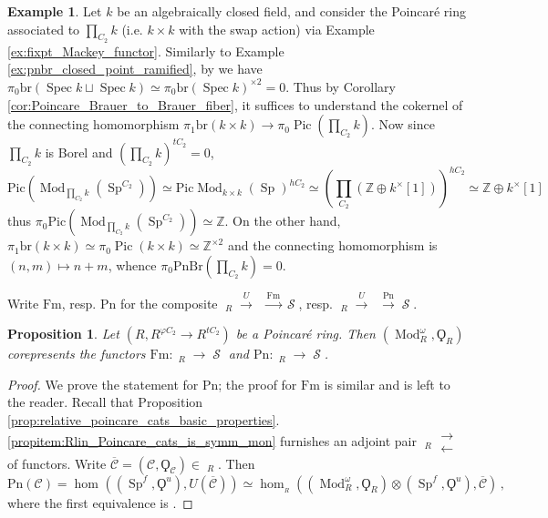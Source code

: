 \documentclass{article}
\DeclareMathOperator{\Spec}{Spec}
\DeclareMathOperator{\Cath}{Cat^h_\infty} %
\DeclareMathOperator{\Catp}{Cat^p_\infty} %
\DeclareMathOperator{\Catpidem}{Cat^p_{\infty, idem}} %
\DeclareMathOperator{\Mod}{Mod} %
\DeclareMathOperator{\Pic}{Pic} %
\DeclareMathOperator{\Spectra}{Sp} %
\DeclareMathOperator{\Spaces}{\mathcal{S}} %
\newcommand{\ZZ}{\mathbb{Z}}
\newcommand{\pnbr}{\ensuremath{\mathrm{PnBr}}}
\newcommand{\pic}{\ensuremath{\mathrm{Pic}}}
\newcommand{\rlarrows}{\mathrel{\substack{\textstyle\longrightarrow\\[-0.6ex]
                                            \textstyle\longleftarrow}}}
\newtheorem{proposition}[equation]{Proposition}
\theoremstyle{definition}
\newtheorem{example}[equation]{Example}
\begin{document}
\begin{example}\label{ex:pnbr_closed_pt_unramified}
    Let $ k $ be an algebraically closed field, and consider the Poincar\'e ring associated to $ \prod_{C_2} k $ (i.e. $ k \times k $ with the swap action) via Example \ref{ex:fixpt_Mackey_functor}. 
    Similarly to Example \ref{ex:pnbr_closed_point_ramified}, by \cite[Proposition 1.9]{MR2957304} we have $ \pi_0 \mathrm{br}(\Spec k \sqcup \Spec k) \simeq \pi_0 \mathrm{br}(\Spec k)^{\times 2} = 0 $. 
    Thus by Corollary \ref{cor:Poincare_Brauer_to_Brauer_fiber}, it suffices to understand the cokernel of the connecting homomorphism $ \pi_1 \mathrm{br}(k \times k) \to \pi_0 \Pic(\prod_{C_2} k) $. 
    Now since $ \prod_{C_2} k $ is Borel and $(\prod_{C_2}k)^{tC_2}=0$, 
    \begin{equation*}
        \pic\left(\Mod_{\prod_{C_2} k}\left(\Spectra^{C_2}\right) \right) \simeq \pic \Mod_{k \times k}(\Spectra)^{hC_2} \simeq \left(\prod_{C_2} (\ZZ \oplus  k^\times[1])\right)^{hC_2} \simeq \ZZ \oplus k^\times [1] 
    \end{equation*}
    thus $ \pi_0 \pic\left(\Mod_{\prod_{C_2} k}\left(\Spectra^{C_2}\right) \right) \simeq \ZZ $. 
    On the other hand, $ \pi_1 \mathrm{br}(k \times k) \simeq \pi_0 \Pic(k \times k) \simeq \ZZ^{\times 2} $ and the connecting homomorphism is $ (n, m) \mapsto n+m $, whence $ \pi_0\pnbr\left(\prod_{C_2} k\right) = 0 $. 
\end{example}
Write $ \mathrm{Fm} $, resp. $ \mathrm{Pn} $ for the composite $ \Cath_R \xrightarrow{U} \Catp \xrightarrow{\mathrm{Fm}} \Spaces $, resp. $ \Catp_R \xrightarrow{U} \Catp \xrightarrow{\mathrm{Pn}} \Spaces $. 
\begin{proposition}
    Let $ (R, R^{\varphi C_2} \to R^{tC_2}) $ be a Poincaré ring. 
    Then $ \left(\Mod_R^\omega, \Qoppa_R \right) $ corepresents the functors $ \mathrm{Fm} \colon \Cath_R \to \Spaces $ and $ \mathrm{Pn} \colon \Catp_R \to \Spaces $.
\end{proposition}
\begin{proof}
    We prove the statement for $ \mathrm{Pn} $; the proof for $ \mathrm{Fm} $ is similar and is left to the reader. 
    Recall that Proposition \ref{prop:relative_poincare_cats_basic_properties}.\ref{propitem:Rlin_Poincare_cats_is_symm_mon} furnishes an adjoint pair $ \Catp_R \rlarrows \Catp $ of functors. 
    Write $ \overline{\mathcal{C}} = (\mathcal{C},\Qoppa_{\mathcal{C}}) \in \Catpidem_R $. 
    Then
    \begin{equation*}
        \mathrm{Pn}(\mathcal{C}) = \hom_{\Catp}\left((\Spectra^f,\Qoppa^u), U(\overline{\mathcal{C}})\right) \simeq \hom_{\Catp_R}\left(\left(\Mod_R^\omega,\Qoppa_R\right)\otimes(\Spectra^f,\Qoppa^u), \overline{\mathcal{C}}\right) \,,
    \end{equation*}
    where the first equivalence is \cite[Proposition 4.1.3]{CDHHLMNNSI}. 
\end{proof}
\end{document}
